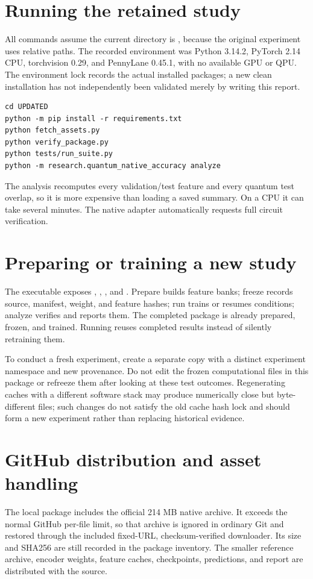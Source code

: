 \documentclass[11pt,a4paper]{report}
\newcommand{\code}[1]{\texttt{\detokenize{#1}}}
\begin{document}
\section{Running the retained study}
All commands assume the current directory is \code{UPDATED}, because the original experiment uses relative paths. The recorded environment was Python 3.14.2, PyTorch 2.14 CPU, torchvision 0.29, and PennyLane 0.45.1, with no available GPU or QPU. The environment lock records the actual installed packages; a new clean installation has not independently been validated merely by writing this report.
\begin{lstlisting}[language={},caption={Reproduce from the standalone folder.}]
cd UPDATED
python -m pip install -r requirements.txt
python fetch_assets.py
python verify_package.py
python tests/run_suite.py
python -m research.quantum_native_accuracy analyze
\end{lstlisting}
The analysis recomputes every validation/test feature and every quantum test overlap, so it is more expensive than loading a saved summary. On a CPU it can take several minutes. The native adapter automatically requests full circuit verification.

\section{Preparing or training a new study}
The executable exposes \code{prepare}, \code{freeze}, \code{run}, and \code{analyze}. Prepare builds feature banks; freeze records source, manifest, weight, and feature hashes; run trains or resumes conditions; analyze verifies and reports them. The completed package is already prepared, frozen, and trained. Running \code{run} reuses completed results instead of silently retraining them.

To conduct a fresh experiment, create a separate copy with a distinct experiment namespace and new provenance. Do not edit the frozen computational files in this package or refreeze them after looking at these test outcomes. Regenerating caches with a different software stack may produce numerically close but byte-different files; such changes do not satisfy the old cache hash lock and should form a new experiment rather than replacing historical evidence.

\section{GitHub distribution and asset handling}
The local package includes the official 214 MB native archive. It exceeds the normal GitHub per-file limit, so that archive is ignored in ordinary Git and restored through the included fixed-URL, checksum-verified downloader. Its size and SHA256 are still recorded in the package inventory. The smaller reference archive, encoder weights, feature caches, checkpoints, predictions, and report are distributed with the source.
\end{document}
